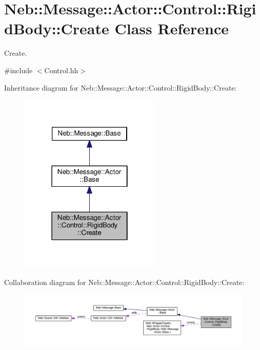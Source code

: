 \hypertarget{classNeb_1_1Message_1_1Actor_1_1Control_1_1RigidBody_1_1Create}{\section{Neb\-:\-:Message\-:\-:Actor\-:\-:Control\-:\-:Rigid\-Body\-:\-:Create Class Reference}
\label{classNeb_1_1Message_1_1Actor_1_1Control_1_1RigidBody_1_1Create}
}


Create.  




{\ttfamily \#include $<$Control.\-hh$>$}



Inheritance diagram for Neb\-:\-:Message\-:\-:Actor\-:\-:Control\-:\-:Rigid\-Body\-:\-:Create\-:
\nopagebreak
\begin{figure}[H]
\begin{center}
\leavevmode
\includegraphics[width=190pt]{classNeb_1_1Message_1_1Actor_1_1Control_1_1RigidBody_1_1Create__inherit__graph}
\end{center}
\end{figure}


Collaboration diagram for Neb\-:\-:Message\-:\-:Actor\-:\-:Control\-:\-:Rigid\-Body\-:\-:Create\-:
\nopagebreak
\begin{figure}[H]
\begin{center}
\leavevmode
\includegraphics[width=350pt]{classNeb_1_1Message_1_1Actor_1_1Control_1_1RigidBody_1_1Create__coll__graph}
\end{center}
\end{figure}
